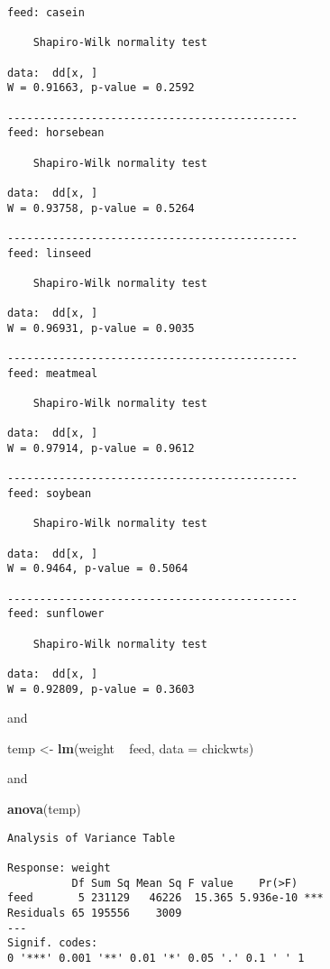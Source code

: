 \documentclass[]{book}
\newenvironment{Shaded}{\begin{snugshade}}{\end{snugshade}}
\newcommand{\KeywordTok}[1]{\textcolor[rgb]{0.13,0.29,0.53}{\textbf{{#1}}}}
\newcommand{\DataTypeTok}[1]{\textcolor[rgb]{0.13,0.29,0.53}{{#1}}}
\newcommand{\StringTok}[1]{\textcolor[rgb]{0.31,0.60,0.02}{{#1}}}
\newcommand{\NormalTok}[1]{{#1}}
\numberwithin{equation}{chapter}
\numberwithin{figure}{chapter}
\theoremstyle{plain}
\theoremstyle{definition}
\theoremstyle{remark}
\theoremstyle{definition}
\theoremstyle{definition}
\theoremstyle{remark}
\begin{document}
\begin{verbatim}
feed: casein

    Shapiro-Wilk normality test

data:  dd[x, ]
W = 0.91663, p-value = 0.2592

--------------------------------------------- 
feed: horsebean

    Shapiro-Wilk normality test

data:  dd[x, ]
W = 0.93758, p-value = 0.5264

--------------------------------------------- 
feed: linseed

    Shapiro-Wilk normality test

data:  dd[x, ]
W = 0.96931, p-value = 0.9035

--------------------------------------------- 
feed: meatmeal

    Shapiro-Wilk normality test

data:  dd[x, ]
W = 0.97914, p-value = 0.9612

--------------------------------------------- 
feed: soybean

    Shapiro-Wilk normality test

data:  dd[x, ]
W = 0.9464, p-value = 0.5064

--------------------------------------------- 
feed: sunflower

    Shapiro-Wilk normality test

data:  dd[x, ]
W = 0.92809, p-value = 0.3603
\end{verbatim}

and

\begin{Shaded}
\begin{Highlighting}[]
\NormalTok{temp <-}\StringTok{ }\KeywordTok{lm}\NormalTok{(weight ~}\StringTok{ }\NormalTok{feed, }\DataTypeTok{data =} \NormalTok{chickwts)}
\end{Highlighting}
\end{Shaded}

and

\begin{Shaded}
\begin{Highlighting}[]
\KeywordTok{anova}\NormalTok{(temp)}
\end{Highlighting}
\end{Shaded}

\begin{verbatim}
Analysis of Variance Table

Response: weight
          Df Sum Sq Mean Sq F value    Pr(>F)    
feed       5 231129   46226  15.365 5.936e-10 ***
Residuals 65 195556    3009                      
---
Signif. codes:  
0 '***' 0.001 '**' 0.01 '*' 0.05 '.' 0.1 ' ' 1
\end{verbatim}
\end{document}
